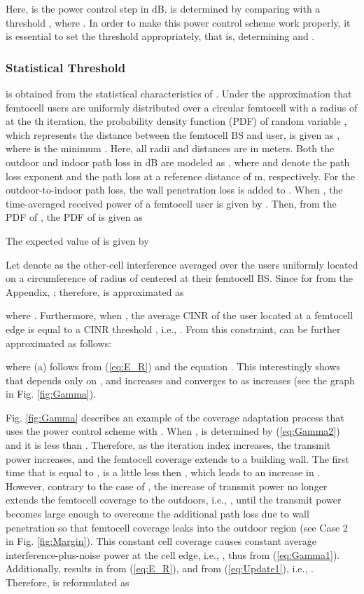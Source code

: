 \documentclass[draftclsnofoot,12pt,onecolumn]{IEEEtran}
\begin{document}
Here,  is the power control step in dB.  is
determined by comparing  with a threshold
, where . In order to make this
power control scheme work properly, it is essential to set the
threshold appropriately, that is, determining  and
.
\subsubsection{Statistical Threshold }
 is obtained from the statistical characteristics of
. Under the approximation that femtocell users are
uniformly distributed over a circular femtocell with a radius of
 at the th iteration, the probability density function (PDF)
of random variable , which represents the distance between the
femtocell BS and user, is given as
,
where  is the minimum . Here, all radii and
distances are in meters. Both the outdoor and indoor path loss in dB
are modeled as , where  and
 denote the path loss exponent and the path loss at a reference
distance of  m, respectively. For the outdoor-to-indoor path
loss, the wall penetration loss  is added to . When
, the time-averaged received power of a femtocell
user is given by . Then, from
the PDF of , the PDF of  is given as

The expected value of  is given by

Let denote  as the other-cell interference averaged over the users uniformly located on a circumference of radius of  centered at their femtocell BS. Since  for  from the Appendix, ; therefore,
 is approximated as

where
.
Furthermore, when , the average CINR of the user
located at a femtocell edge is equal to a CINR threshold
, i.e.,
. From
this constraint,  can be further approximated as
follows:

where (a) follows from (\ref{eq:E_R}) and the equation .
This interestingly shows that  depends only on
, and increases and converges to
 as  increases
(see the  graph  in Fig. \ref{fig:Gamma}).

Fig. \ref{fig:Gamma} describes an example of the coverage adaptation
process that uses the power control scheme with
. When , 
is determined by (\ref{eq:Gamma2}) and it is less than .
Therefore, as the iteration index  increases, the transmit power
 increases, and the femtocell coverage 
extends to a building wall. The first time that  is equal
to ,  is a little less then ,
which leads to an increase in . However, contrary to the
case of , the increase of transmit power no longer extends the
femtocell coverage to the outdoors, i.e., ,
until the transmit power becomes large enough to overcome the
additional path loss due to wall penetration so that femtocell
coverage leaks into the outdoor region (see Case 2 in Fig.
\ref{fig:Margin}). This constant cell coverage causes constant average interference-plus-noise power at the cell edge, i.e.,
, thus
 from
(\ref{eq:Gamma1}). Additionally,  results in
 from (\ref{eq:E_R}),
and  from (\ref{eq:Update1}),
i.e., . Therefore,
 is reformulated as
\end{document}
